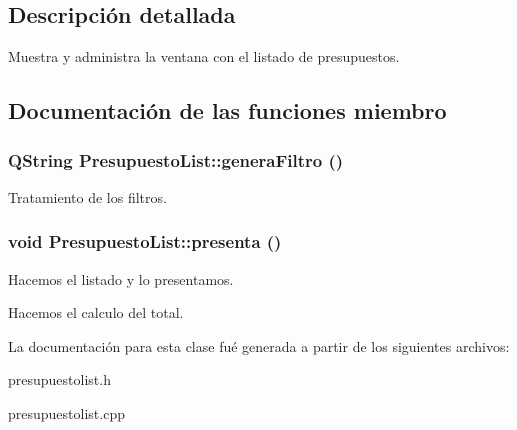 \subsection{Descripci\'{o}n detallada}
Muestra y administra la ventana con el listado de presupuestos. 



\subsection{Documentaci\'{o}n de las funciones miembro}
\subsubsection{\setlength{\rightskip}{0pt plus 5cm}QString Presupuesto\-List::genera\-Filtro ()}\label{classPresupuestoList_a1}


Tratamiento de los filtros. 
\subsubsection{\setlength{\rightskip}{0pt plus 5cm}void Presupuesto\-List::presenta ()}\label{classPresupuestoList_a11}


Hacemos el listado y lo presentamos.

Hacemos el calculo del total. 

La documentaci\'{o}n para esta clase fu\'{e} generada a partir de los siguientes archivos:\begin{CompactItemize}
\item 
presupuestolist.h\item 
presupuestolist.cpp\end{CompactItemize}
